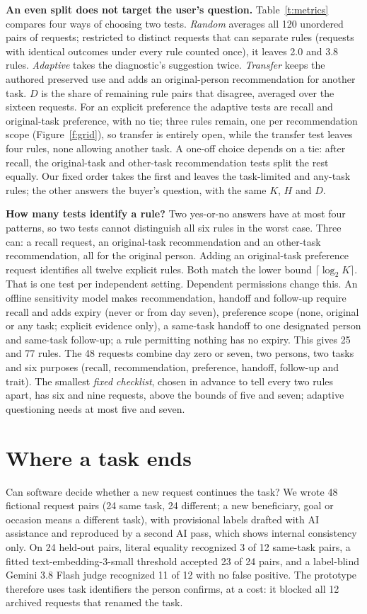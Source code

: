 \documentclass[manuscript,review]{acmart}
\begin{document}
\textbf{An even split does not target the user's question.} Table~\ref{t:metrics} compares four ways of choosing two tests. \emph{Random} averages all 120 unordered pairs of requests; restricted to distinct requests that can separate rules (requests with identical outcomes under every rule counted once), it leaves 2.0 and 3.8 rules. \emph{Adaptive} takes the diagnostic's suggestion twice. \emph{Transfer} keeps the authored preserved use and adds an original-person recommendation for another task. $D$ is the share of remaining rule pairs that disagree, averaged over the sixteen requests. For an explicit preference the adaptive tests are recall and original-task preference, with no tie; three rules remain, one per recommendation scope (Figure~\ref{f:grid}), so transfer is entirely open, while the transfer test leaves four rules, none allowing another task. A one-off choice depends on a tie: after recall, the original-task and other-task recommendation tests split the rest equally. Our fixed order takes the first and leaves the task-limited and any-task rules; the other answers the buyer's question, with the same $K$, $H$ and $D$.

\textbf{How many tests identify a rule?} Two yes-or-no answers have at most four patterns, so two tests cannot distinguish all six rules in the worst case. Three can: a recall request, an original-task recommendation and an other-task recommendation, all for the original person. Adding an original-task preference request identifies all twelve explicit rules. Both match the lower bound $\lceil\log_2 K\rceil$. That is one test per independent setting. Dependent permissions change this. An offline sensitivity model makes recommendation, handoff and follow-up require recall and adds expiry (never or from day seven), preference scope (none, original or any task; explicit evidence only), a same-task handoff to one designated person and same-task follow-up; a rule permitting nothing has no expiry. This gives 25 and 77 rules. The 48 requests combine day zero or seven, two persons, two tasks and six purposes (recall, recommendation, preference, handoff, follow-up and trait). The smallest \emph{fixed checklist}, chosen in advance to tell every two rules apart, has six and nine requests, above the bounds of five and seven; adaptive questioning needs at most five and seven.

\section{Where a task ends}
Can software decide whether a new request continues the task? We wrote 48 fictional request pairs (24 same task, 24 different; a new beneficiary, goal or occasion means a different task), with provisional labels drafted with AI assistance and reproduced by a second AI pass, which shows internal consistency only. On 24 held-out pairs, literal equality recognized 3 of 12 same-task pairs, a fitted text-embedding-3-small threshold accepted 23 of 24 pairs, and a label-blind Gemini 3.8 Flash judge recognized 11 of 12 with no false positive. The prototype therefore uses task identifiers the person confirms, at a cost: it blocked all 12 archived requests that renamed the task.
\end{document}
